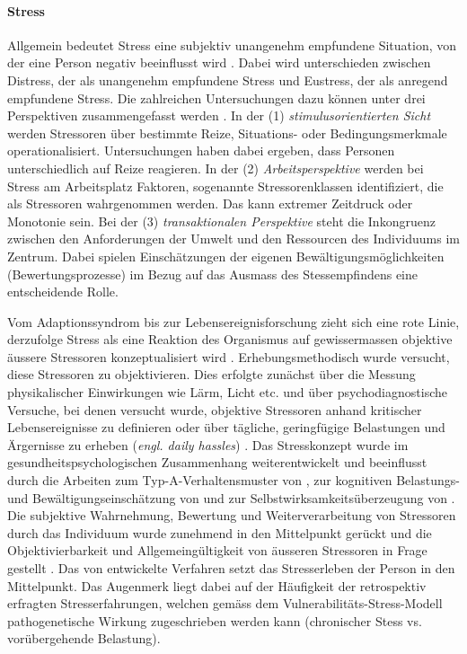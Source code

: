\paragraph{Stress}\label{sec:Stress}
Allgemein bedeutet Stress eine subjektiv unangenehm empfundene Situation, von der eine Person negativ beeinflusst wird \cite[S.~1500]{Stress2014}. Dabei wird unterschieden zwischen Distress, der als unangenehm empfundene Stress und Eustress, der als anregend empfundene Stress. Die zahlreichen Untersuchungen dazu können unter drei Perspektiven zusammengefasst werden \cite[S.~1500]{Stress2014}. In der (1) \textit{stimulusorientierten Sicht} werden Stressoren über bestimmte Reize, Situations- oder Bedingungsmerkmale operationalisiert. Untersuchungen haben dabei ergeben, dass Personen unterschiedlich auf Reize reagieren. In der (2) \textit{Arbeitsperspektive} werden bei Stress am Arbeitsplatz Faktoren, sogenannte Stressorenklassen identifiziert, die als Stressoren wahrgenommen werden. Das kann extremer Zeitdruck oder Monotonie sein. Bei der (3) \textit{transaktionalen Perspektive} steht die Inkongruenz zwischen den Anforderungen der Umwelt und den Ressourcen des Individuums im Zentrum. Dabei spielen Einschätzungen der eigenen Bewältigungsmöglichkeiten (Bewertungsprozesse) im Bezug auf das Ausmass des Stessempfindens eine entscheidende Rolle. 

Vom Adaptionssyndrom \cite{Selye1936} bis zur Lebensereignisforschung zieht sich eine rote Linie, derzufolge Stress als eine Reaktion des Organismus auf gewissermassen objektive äussere Stressoren konzeptualisiert wird \cite{Fliege2001}. Erhebungsmethodisch wurde versucht, diese Stressoren zu objektivieren. Dies erfolgte zunächst über die Messung physikalischer Einwirkungen wie Lärm, Licht etc. und über psychodiagnostische Versuche, bei denen versucht wurde, objektive Stressoren anhand kritischer Lebensereignisse zu definieren \cite{Holmes1980} oder über tägliche, geringfügige Belastungen und Ärgernisse zu erheben (\textit{engl. daily hassles}) \cite{Quast1986}. Das Stresskonzept wurde im gesundheitspsychologischen Zusammenhang weiterentwickelt und beeinflusst durch die Arbeiten zum Typ-A-Verhaltensmuster von , zur kognitiven Belastungs- und Bewältigungseinschätzung von  und zur Selbstwirksamkeitsüberzeugung von . Die subjektive Wahrnehmung, Bewertung und Weiterverarbeitung von Stressoren durch das Individuum wurde zunehmend in den Mittelpunkt gerückt und die Objektivierbarkeit und Allgemeingültigkeit von äusseren Stressoren in Frage gestellt \cite{Fliege2001}. Das von  entwickelte Verfahren setzt das Stresserleben der Person in den Mittelpunkt. Das Augenmerk liegt dabei auf der Häufigkeit der retrospektiv erfragten Stresserfahrungen, welchen gemäss dem Vulnerabilitäts-Stress-Modell pathogenetische Wirkung zugeschrieben werden kann (chronischer Stess vs. vorübergehende Belastung).

